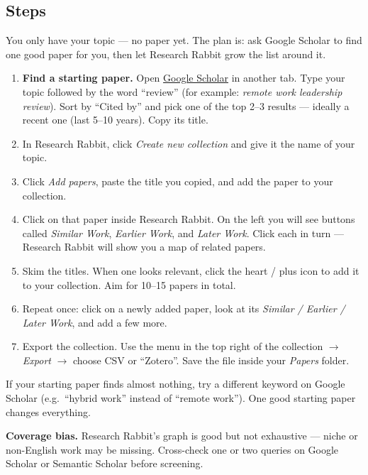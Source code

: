 \documentclass[11pt,a4paper]{article}
\begin{document}
\subsection*{Steps}
You only have your topic --- no paper yet. The plan is: ask Google Scholar to find one good paper for you, then let Research Rabbit grow the list around it.

\begin{enumerate}[leftmargin=*, itemsep=2pt]
  \item \textbf{Find a starting paper.} Open \href{https://scholar.google.com/}{Google Scholar} in another tab. Type your topic followed by the word ``review'' (for example: \emph{remote work leadership review}). Sort by ``Cited by'' and pick one of the top 2--3 results --- ideally a recent one (last 5--10 years). Copy its title.
  \item In Research Rabbit, click \emph{Create new collection} and give it the name of your topic.
  \item Click \emph{Add papers}, paste the title you copied, and add the paper to your collection.
  \item Click on that paper inside Research Rabbit. On the left you will see buttons called \emph{Similar Work}, \emph{Earlier Work}, and \emph{Later Work}. Click each in turn --- Research Rabbit will show you a map of related papers.
  \item Skim the titles. When one looks relevant, click the heart / plus icon to add it to your collection. Aim for 10--15 papers in total.
  \item Repeat once: click on a newly added paper, look at its \emph{Similar / Earlier / Later Work}, and add a few more.
  \item Export the collection. Use the menu in the top right of the collection \(\to\) \emph{Export} \(\to\) choose CSV or ``Zotero''. Save the file inside your \emph{Papers} folder.
\end{enumerate}

\begin{tipbox}
If your starting paper finds almost nothing, try a different keyword on Google Scholar (e.g.\ ``hybrid work'' instead of ``remote work''). One good starting paper changes everything.
\end{tipbox}

\begin{watchout}
\textbf{Coverage bias.} Research Rabbit's graph is good but not exhaustive --- niche or non-English work may be missing. Cross-check one or two queries on Google Scholar or Semantic Scholar before screening.
\end{watchout}
\end{document}
